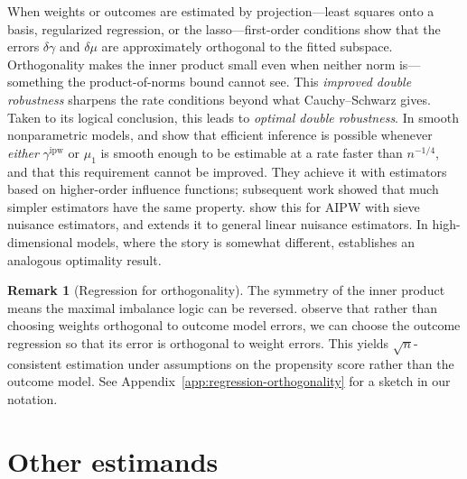 \documentclass{article}
\theoremstyle{definition}
\newtheorem{remark}{Remark}
\newcommand{\ipw}{\text{ipw}}
\newcommand{\dgamma}{\delta\gamma}
\newcommand{\dm}{\delta \mu}
\newcommand{\gammaipw}{\ensuremath{\gamma^{\ipw}}}
\newcommand{\<}{\langle}
\renewcommand{\>}{\rangle}
\begin{document}
When weights or outcomes are estimated by projection---least squares onto a basis, regularized regression, or the lasso---first-order conditions show that the errors $\dgamma$ and $\dm$ are approximately orthogonal to the fitted subspace. Orthogonality makes the inner product small even when neither norm is---something the product-of-norms bound cannot see. This \emph{improved double robustness} \citep{vermeulen2015bias,tan2010bounded} sharpens the rate conditions beyond what Cauchy--Schwarz gives. Taken to its logical conclusion, this leads to \emph{optimal double robustness}. In smooth nonparametric models, \citet{mukherjee2017semiparametric} and \citet{robins2009semiparametric} show that efficient inference is possible whenever \emph{either} $\gammaipw$ or $\mu_1$ is smooth enough to be estimable at a rate faster than $n^{-1/4}$, and that this requirement cannot be improved. They achieve it with estimators based on higher-order influence functions; subsequent work showed that much simpler estimators have the same property. \citet{newey2018cross} show this for AIPW with sieve nuisance estimators, and \citet{kennedy2020optimal} extends it to general linear nuisance estimators. In high-dimensional models, where the story is somewhat different, \citet{bradic2019sparsity} establishes an analogous optimality result.

\begin{remark}[Regression for orthogonality]
\label{remark:regression-for-orthogonality}
The symmetry of the inner product means the maximal imbalance logic can be reversed. \citet{wang2020debiased} observe that rather than choosing weights orthogonal to outcome model errors, we can choose the outcome regression so that its error is orthogonal to weight errors. This yields $\sqrt{n}$-consistent estimation under assumptions on the propensity score rather than the outcome model. See Appendix~\ref{app:regression-orthogonality} for a sketch in our notation.
\end{remark}


\section{Other estimands}
\label{sec:other-estimands}
\end{document}

